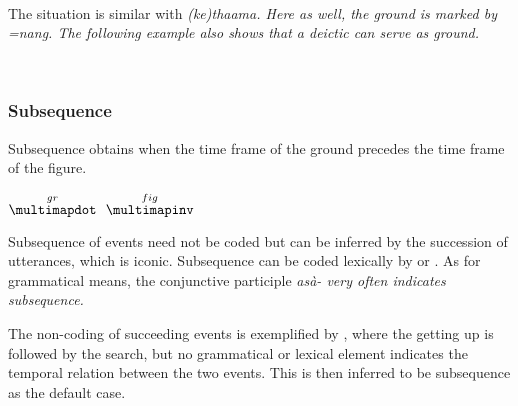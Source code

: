  \\

The situation is similar with \em (ke)thaama\em. Here as well, the ground is marked by \em =nang. \em The following example also shows that  a deictic can serve as ground.


 \\

\subsubsection{Subsequence}\label{sec:func:Subsequence}
Subsequence obtains when the time frame of the ground precedes the time frame of the figure.


\ea $\stackrel{gr}{\multimapdot}~~\stackrel{fig}{\multimapinv}$\z

Subsequence of events need not be coded but can be inferred by the succession of utterances, which is iconic.
Subsequence can be coded lexically by  or . As for grammatical means, the conjunctive participle \em asà- \em very often indicates subsequence.


The non-coding of succeeding events is exemplified by , where the getting up is followed by the search, but no grammatical or lexical element indicates the temporal relation between the two events. This is then inferred to be subsequence as the default case.

\\

